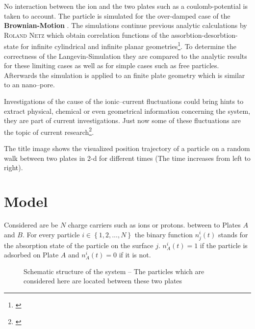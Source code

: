 \documentclass[a4paper, parskip=half]{scrartcl}
\newcommand{\person}[1]{%
	\textsc{#1}%
}
\newcommand{\effect}[1]{%
	\textbf{#1}%
}
\newcommand{\myCite}[1]{\footnote{\cite{#1} \citeauthor{#1} \citetitle{#1} \citeyear{#1}}}
\begin{document}
No interaction between the ion and the two plates such as a coulomb-potential is taken to account. The particle is simulated for the over-damped case of the \effect{Brownian-Motion}. The simulations continue previous analytic calculations by \person{Roland Netz} which obtain correlation functions of the assorbtion-desorbtion-state for infinite cylindrical and infinite planar geometries\myCite{netzpaper}. To determine the correctness of the Langevin-Simulation they are compared to the analytic results for these limiting cases as well as for simple cases such as free particles. Afterwards the simulation is applied to an finite plate geometry which is similar to an nano--pore.

Investigations of the cause of the ionic--current fluctuations could bring hints to extract physical, chemical or even geometrical information concerning the system, they are part of current investigations. Just now some of these fluctuations are the topic of current research\myCite{paper2}. 

The title image shows the visualized position trajectory of a particle on a random walk between two plates in 2-d for different times (The time increases from left to right).


\newpage

\section{Model}
Considered are be $N$ charge carriers such as ions or protons. between to Plates $A$ and $B$. For every particle $i\in\left\lbrace 1,2,...,N \right\rbrace$ the binary function $n_j^i(t)$ stands for the absorption state of the particle on the surface $j$. $n_A^i(t) = 1$ if the particle is adsorbed on Plate $A$ and $n_A^i(t) = 0$ if it is not.

\begin{figure}[H]
\centering
{}
\caption{Schematic structure of the system -- The particles which are considered here are located between these two plates}
\end{figure}
\end{document}
